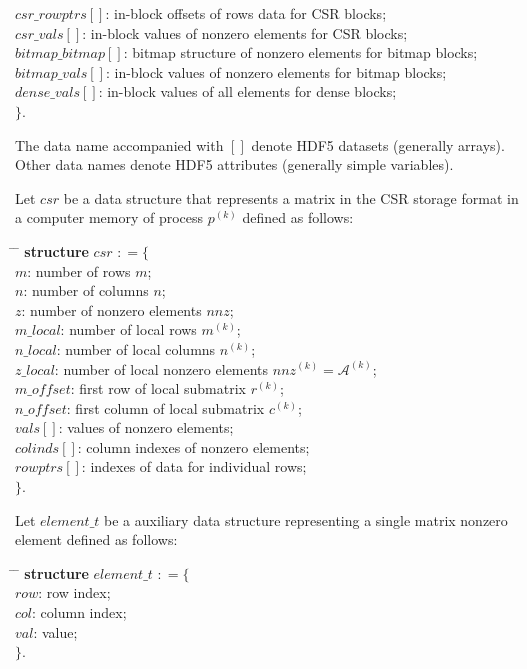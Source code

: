 \documentclass[10pt,a4paper]{article}
\providecommand{\nnz}{\ensuremath{\mathit{nnz}}\xspace}
\providecommand{\var}[1]{\ensuremath{\mathit{#1}}\xspace}
\begin{document}
\begin{tabbing}
\> \var{csr\_rowptrs[]}:   \> in-block offsets of rows data for CSR blocks; \\
\> \var{csr\_vals[]}:      \> in-block values of nonzero elements for CSR blocks; \\
\> \var{bitmap\_bitmap[]}: \> bitmap structure of nonzero elements for bitmap blocks; \\
\> \var{bitmap\_vals[]}:   \> in-block values of nonzero elements for bitmap blocks; \\
\> \var{dense\_vals[]}:    \> in-block values of all elements for dense blocks; \\
$\}$.
\end{tabbing}

The data name accompanied with $[]$ denote HDF5 datasets (generally arrays). Other data names denote HDF5 attributes (generally simple variables). 

Let \var{csr} be a data structure that represents a matrix in the CSR storage format in a computer memory of process $p^{(k)}$ defined as follows:
\begin{tabbing}
\hspace*{1em} \= \hspace*{6em} \= \kill
\textbf{structure} \var{csr} $\mathrel{\mathop:}= \{$ \\
\> \var{m}:           \> number of rows $m$; \\
\> \var{n}:           \> number of columns $n$; \\
\> \var{z}:           \> number of nonzero elements \nnz; \\
\> \var{m\_local}:    \> number of local rows $m^{(k)}$; \\
\> \var{n\_local}:    \> number of local columns $n^{(k)}$; \\
\> \var{z\_local}:    \> number of local nonzero elements $\var{nnz}^{(k)}=\mathcal{A}^{(k)}$; \\
\> \var{m\_offset}:   \> first row of local submatrix $r^{(k)}$; \\
\> \var{n\_offset}:   \> first column of local submatrix $c^{(k)}$; \\
\> \var{vals[]}:      \> values of nonzero elements; \\
\> \var{colinds[]}:   \> column indexes of nonzero elements; \\
\> \var{rowptrs[]}:   \> indexes of data for individual rows; \\
$\}$.
\end{tabbing}

Let \var{element\_t} be a auxiliary data structure representing a single matrix nonzero element defined as follows:
\begin{tabbing}
\hspace*{1em} \= \hspace*{4em} \= \kill
\textbf{structure} \var{element\_t} $\mathrel{\mathop:}= \{$ \\
\> \var{row}:	\> row index; \\
\> \var{col}:	\> column index; \\
\> \var{val}:   \> value; \\
$\}$.
\end{tabbing}
\end{document}
